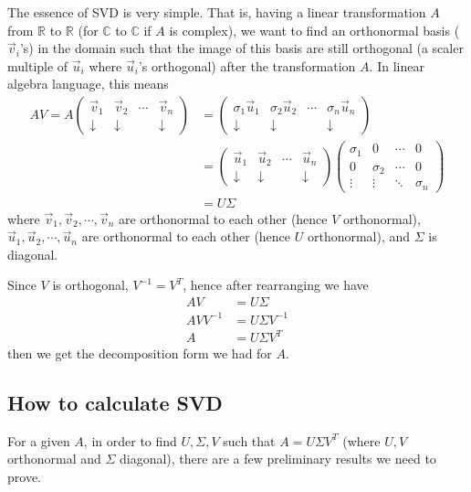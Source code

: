 \documentclass{article}
\begin{document}
The essence of SVD is very simple. That is, having a linear transformation $A$ from $\mathbb{R}$ to $\mathbb{R}$ (for $\mathbb{C}$ to $\mathbb{C}$ if $A$ is complex), we want to find an orthonormal basis ($\vec{v}_i$'s) in the domain such that the image of this basis are still orthogonal (a scaler multiple of $\vec{u}_i$ where $\vec{u}_i$'s orthogonal) after the transformation $A$. In linear algebra language, this means 
\begin{align*}
AV =A \begin{pmatrix} \vec{v}_1 & \vec{v}_2 & \cdots & \vec{v}_n  \\ \downarrow & \downarrow & &\downarrow \end{pmatrix} &= \begin{pmatrix} \sigma_1 \vec{u}_1 & \sigma_2 \vec{u}_2 & \cdots &\sigma_n \vec{u}_n  \\ \downarrow & \downarrow & &\downarrow \end{pmatrix} \\
&= \begin{pmatrix} \vec{u}_1 & \vec{u}_2 & \cdots & \vec{u}_n  \\ \downarrow & \downarrow & &\downarrow \end{pmatrix} \begin{pmatrix} \sigma_1 & 0 & \cdots & 0 \\ 0& \sigma_2 & \cdots & 0 \\ \vdots & \vdots & \ddots & \sigma_n \end{pmatrix} \\
&= U \Sigma
\end{align*}
where $\vec{v}_1, \vec{v}_2, \cdots, \vec{v}_n$ are orthonormal to each other (hence $V$ orthonormal), $\vec{u}_1, \vec{u}_2, \cdots, \vec{u}_n$ are orthonormal to each other (hence $U$ orthonormal), and $\Sigma$ is diagonal.

Since $V$ is orthogonal, $V^{-1} = V^T$, hence after rearranging we have
\begin{align*}
AV &= U \Sigma \\
AV V^{-1} &= U \Sigma V^{-1} \\
A &= U\Sigma V^T
\end{align*}
then we get the decomposition form we had for $A$.

\subsection{How to calculate SVD}
For a given $A$, in order to find $U, \Sigma, V$ such that $A = U \Sigma V^T$ (where $U,V$ orthonormal and $\Sigma$ diagonal), there are a few preliminary results we need to prove.
\bigskip
\end{document}
